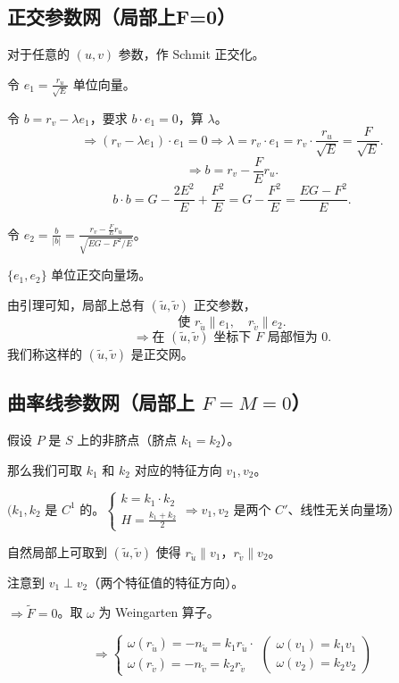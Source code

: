 \documentclass[lang=cn,10pt,thmcnt=section]{elegantbook}
\begin{document}
\subsection{正交参数网（局部上F=0）}
对于任意的 $(u,v)$ 参数，作 Schmit 正交化。

令 $e_1 = \frac{r_u}{\sqrt{E}}$ 单位向量。

令 $b = r_v - \lambda e_1$，要求 $b \cdot e_1 = 0$，算 $\lambda$。
\[
\Rightarrow (r_v - \lambda e_1) \cdot e_1 = 0 \Rightarrow \lambda = r_v \cdot e_1 = r_v \cdot \frac{r_u}{\sqrt{E}} = \frac{F}{\sqrt{E}}.
\]
\[
\Rightarrow b = r_v - \frac{F}{E} r_u.
\]
\[
b \cdot b = G - \frac{2E^2}{E} + \frac{F^2}{E} = G - \frac{F^2}{E} = \frac{EG - F^2}{E}.
\]

令 $e_2 = \frac{b}{|b|} = \frac{r_v - \frac{F}{E} r_u}{\sqrt{EG - F^2 / E}}$。

$\{e_1, e_2\}$ 单位正交向量场。

由引理可知，局部上总有 $(\widetilde{u}, \widetilde{v})$ 正交参数，
\[
\text{使 } r_{\widetilde{u}} \parallel e_1, \quad r_{\widetilde{v}} \parallel e_2.
\]
\[
\Rightarrow \text{在 } (\widetilde{u}, \widetilde{v}) \text{ 坐标下 } F \text{ 局部恒为 } 0.
\]
我们称这样的 $(\widetilde{u}, \widetilde{v})$ 是正交网。
\subsection{曲率线参数网（局部上 \(F = M = 0\)）}
假设 $P$ 是 $S$ 上的非脐点（脐点 $k_1 = k_2$）。

那么我们可取 $k_1$ 和 $k_2$ 对应的特征方向 $v_1, v_2$。

$(k_1, k_2$ 是 $C^1$ 的。$\left\{
\begin{array}{l}
k = k_1 \cdot k_2 \\
H = \frac{k_1 + k_2}{2}
\end{array}
\right. \Rightarrow v_1, v_2$ 是两个 $C'$、线性无关向量场）

自然局部上可取到 $(\widetilde{u}, \widetilde{v})$ 使得 $r_{\widetilde{u}} \parallel v_1$，$r_{\widetilde{v}} \parallel v_2$。

注意到 $v_1 \perp v_2$（两个特征值的特征方向）。

$\Rightarrow \widetilde{F} = 0$。取 $\omega$ 为 Weingarten 算子。

\[
\Rightarrow
\left\{
\begin{array}{l}
\omega(r_{\widetilde{u}}) = -n_{\widetilde{u}} = k_1 r_{\widetilde{u}} \cdot \\
\omega(r_{\widetilde{v}}) = -n_{\widetilde{v}} = k_2 r_{\widetilde{v}}
\end{array}
\right.
\left(
\begin{array}{l}
\omega(v_1) = k_1 v_1 \\
\omega(v_2) = k_2 v_2
\end{array}
\right)
\]
\end{document}
